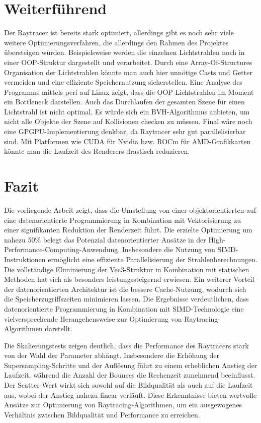 \documentclass[sigconf]{acmart}
\begin{document}
\section{Weiterführend}
Der Raytracer ist bereits stark optimiert, allerdings gibt es noch sehr viele weitere Optimierungsverfahren, die allerdings den Rahmen des Projektes übersteigen würden.
Beispielsweise werden die einzelnen Lichtstrahlen noch in einer OOP-Struktur dargestellt und verarbeitet. Durch eine Array-Of-Structures Organisation der Lichtstrahlen könnte man auch hier unnötige Casts und Getter vermeiden und eine effiziente Speichernutzung sicherstellen. Eine Analyse des Programms mittels perf auf Linux zeigt, dass die OOP-Lichtstrahlen im Moment ein Bottleneck darstellen.
Auch das Durchlaufen der gesamten Szene für einen Lichtstrahl ist nicht optimal. Es würde sich ein BVH-Algorithmus anbieten, um nicht alle Objekte der Szene auf Kollisionen checken zu müssen.
Final wäre noch eine GPGPU-Implementierung denkbar, da Raytracer sehr gut parallelisierbar sind. Mit Platformen wie CUDA für Nvidia bzw. ROCm für AMD-Grafikkarten könnte man die Laufzeit des Renderers drastisch reduzieren. 


\section{Fazit} \label{Fazit}
Die vorliegende Arbeit zeigt, dass die Umstellung von einer objektorientierten auf eine datenorientierte Programmierung in Kombination mit Vektorisierung zu einer signifikanten Reduktion der Renderzeit führt.
Die erzielte Optimierung um nahezu 50\% belegt das Potenzial datenorientierter Ansätze in der High-Performance-Computing-Anwendung.
Insbesondere die Nutzung von SIMD-Instruktionen ermöglicht eine effiziente Parallelisierung der Strahlenberechnungen.
Die vollständige Eliminierung der Vec3-Struktur in Kombination mit statischen Methoden hat sich als besonders leistungssteigernd erwiesen.
Ein weiterer Vorteil der datenorientierten Architektur ist die bessere Cache-Nutzung, wodurch sich die Speicherzugriffszeiten minimieren lassen.
Die Ergebnisse verdeutlichen, dass datenorientierte Programmierung in Kombination mit SIMD-Technologie eine vielversprechende Herangehensweise zur Optimierung von Raytracing-Algorithmen darstellt.

Die Skalierungstests zeigen deutlich, dass die Performance des Raytracers stark von der Wahl der Parameter abhängt.
Insbesondere die Erhöhung der Supersampling-Schritte und der Auflösung führt zu einem erheblichen Anstieg der Laufzeit, während die Anzahl der Bounces die Rechenzeit zunehmend beeinflusst.
Der Scatter-Wert wirkt sich sowohl auf die Bildqualität als auch auf die Laufzeit aus, wobei der Anstieg nahezu linear verläuft.
Diese Erkenntnisse bieten wertvolle Ansätze zur Optimierung von Raytracing-Algorithmen, um ein ausgewogenes Verhältnis zwischen Bildqualität und Performance zu erreichen.
\end{document}
